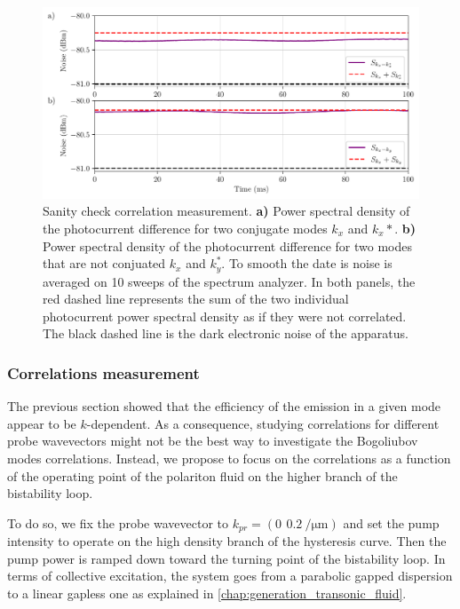 \begin{figure}
    \centering
    \includegraphics[width=1\textwidth]{chap_correlation/fig/noise_comparison.pdf}
    \caption{Sanity check correlation measurement. \textbf{a)} Power spectral density of the photocurrent difference for two conjugate modes $k_x$ and $k_x*$. \textbf{b)} Power spectral density of the photocurrent difference for two modes that are not conjuated $k_x$ and $k_y^*$. To smooth 
    the date is noise is averaged on 10 sweeps of the spectrum analyzer. In both panels, the red dashed line represents the sum of the two individual photocurrent power spectral density as if they were not correlated. The black dashed line is the dark electronic noise of the apparatus.} 
    \label{fig:noise_comparison}
\end{figure}



\subsubsection{Correlations measurement}
\label{sec:exp_corr_measurement}

The previous section showed that the efficiency of the emission in a given mode appear to be $k$-dependent. As a consequence, studying correlations for different probe wavevectors might not be the best way to investigate the Bogoliubov modes correlations.
Instead, we propose to focus on the correlations as a function of the operating point of the polariton fluid on the higher branch of the bistability loop. 

To do so, we fix the probe wavevector to $k_{pr}=(0\,\ \SI{0.2}{\per\micro\meter})$ and set the pump intensity to operate on the high density branch of the hysteresis curve. Then the pump power is ramped down toward the turning point of the bistability loop.
In terms of collective excitation, the system goes from a parabolic gapped dispersion to a linear gapless one as explained in \autoref{chap:generation_transonic_fluid}.


